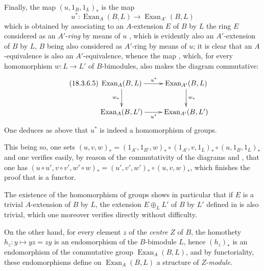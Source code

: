 \begin{env}[18.3.6.4]
\label{0.18.3.6.4}
Finally, the map $(u,1_B,1_L)_*$ is the map
\begin{equation}
  u^*:\operatorname{Exan}_A(B,L)\to\operatorname{Exan}_{A'}(B,L)
\end{equation}
which is obtained by associating to an $A$-extension $E$ of $B$ by $L$ the ring $E$ considered as an $A'$-\emph{ring} by means of $u$ , which is evidently also an $A'$-extension of $B$ by $L$, $B$ being also considered as $A'$-ring by means of $u$; it is clear that an $A$-equivalence is also an $A'$-equivalence, whence the map , which, for every homomorphism $w:L\to L'$ of $B$-bimodules, also makes the diagram commutative:
  \begin{equation}
  \tag{18.3.6.5}
  \label{0.18.3.6.5}
  \xymatrix{
    \operatorname{Exan}_A(B,L)\ar[r]^{u^*}\ar[d]_{w_*} & \operatorname{Exan}_{A'}(B,L)\ar[d]^{w_*}\\
    \operatorname{Exan}_A(B,L')\ar[r]_{u^*} & \operatorname{Exan}_{A'}(B,L')
  }
  \end{equation}
One deduces as above that $u^*$ is indeed a homomorphism of groups.

This being so, one sets $(u,v,w)_*=(1_{A'},1_{B'},w)_*\circ(1_{A'},v,1_L)_*\circ(u,1_B,1_L)_*$ and one verifies easily, by reason of the commutativity of the diagrams  and , that one has $(u\circ u',v\circ v',w'\circ w)_*=(u',v',w')_*\circ(u,v,w)_*$, which finishes the proof that  is a functor.

The existence of the homomorphism of groups  shows in particular that if $E$ is a trivial $A$-extension of $B$ by $L$, the extension $E\oplus_L L'$ of $B$ by $L'$ defined in  is also trivial, which one moreover verifies directly without difficulty.

On the other hand, for every element $z$ of the \emph{centre} $Z$ of $B$, the homothety $h_z:y\mapsto yz=zy$ is an endomorphism of the $B$-bimodule $L$, hence $(h_z)_*$ is an endomorphism of the commutative group $\operatorname{Exan}_A(B,L)$, and by functoriality, these endomorphisms define on $\operatorname{Exan}_A(B,L)$ a structure of $Z$-\emph{module}.
\end{env}

